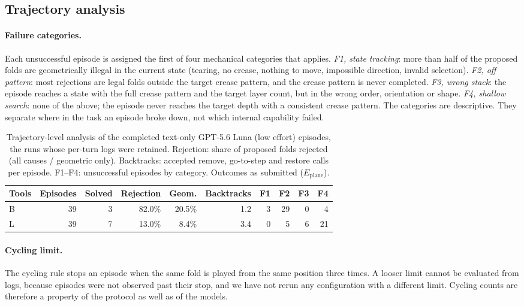\subsection{Trajectory analysis}
\label{app:matched-trajectories}

\paragraph{Failure categories.} Each unsuccessful episode is assigned the first of four
mechanical categories that applies. \emph{F1, state tracking}: more than half of the proposed folds
are geometrically illegal in the current state (tearing, no crease, nothing to move, impossible
direction, invalid selection). \emph{F2, off pattern}: most rejections are legal folds outside the
target crease pattern, and the crease pattern is never completed. \emph{F3, wrong stack}: the
episode reaches a state with the full crease pattern and the target layer count, but in the wrong
order, orientation or shape. \emph{F4, shallow search}: none of the above; the episode never
reaches the target depth with a consistent crease pattern. The categories are descriptive. They
separate where in the task an episode broke down, not which internal capability failed.

\begin{table}[htbp]
\centering
\caption{Trajectory-level analysis of the completed text-only GPT-5.6 Luna (low effort)
episodes, the runs whose per-turn logs were retained. Rejection: share of proposed folds rejected
(all causes / geometric only). Backtracks: accepted remove, go-to-step and restore calls per
episode. F1--F4: unsuccessful episodes by category. Outcomes as submitted ($E_{\mathrm{plane}}$).}
\label{tab:trajectories}
\small
\setlength{\tabcolsep}{4pt}
\begin{tabular}{lrrrrrrrrr}
\hline
Tools & Episodes & Solved & Rejection & Geom. & Backtracks & F1 & F2 & F3 & F4 \\
\hline
B & 39 & 3 & 82.0\% & 20.5\% & 1.2 & 3 & 29 & 0 & 4 \\
L & 39 & 7 & 13.0\% & 8.4\% & 3.4 & 0 & 5 & 6 & 21 \\
\hline
\end{tabular}
\end{table}

\paragraph{Cycling limit.} The cycling rule stops an episode when the same fold is played from the
same position three times. A looser limit cannot be evaluated from logs, because episodes were not
observed past their stop, and we have not rerun any configuration with a different limit. Cycling
counts are therefore a property of the protocol as well as of the models.

